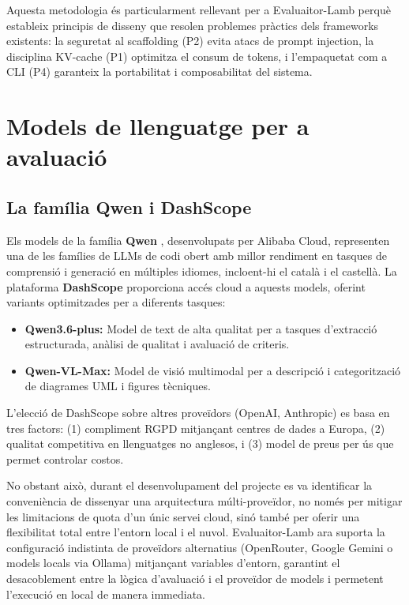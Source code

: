 \documentclass[12pt,a4paper,twoside]{report}
\begin{document}
Aquesta metodologia \'es particularment rellevant per a Evaluaitor-Lamb perqu\`e estableix principis de disseny que resolen problemes pr\`actics dels frameworks existents: la seguretat al scaffolding (P2) evita atacs de prompt injection, la disciplina KV-cache (P1) optimitza el consum de tokens, i l'empaquetat com a CLI (P4) garanteix la portabilitat i composabilitat del sistema.

\section{Models de llenguatge per a avaluaci\'o}
\label{sec:models-ll}

\subsection{La fam\'ilia Qwen i DashScope}
\label{subsec:qwen}

Els models de la fam\'ilia \textbf{Qwen} \cite{qwen2024}, desenvolupats per Alibaba Cloud, representen una de les fam\'ilies de LLMs de codi obert amb millor rendiment en tasques de comprensi\'o i generaci\'o en m\'ultiples idiomes, incloent-hi el catal\`a i el castell\`a. La plataforma \textbf{DashScope} proporciona acc\'es cloud a aquests models, oferint variants optimitzades per a diferents tasques:

\begin{itemize}
    \item \textbf{Qwen3.6-plus:} Model de text de alta qualitat per a tasques d'extracci\'o estructurada, an\`alisi de qualitat i avaluaci\'o de criteris.
    \item \textbf{Qwen-VL-Max:} Model de visi\'o multimodal per a descripci\'o i categoritzaci\'o de diagrames UML i figures t\`ecniques.
\end{itemize}

L'elecci\'o de DashScope sobre altres prove\"idors (OpenAI, Anthropic) es basa en tres factors: (1) compliment RGPD mitjan\c{c}ant centres de dades a Europa, (2) qualitat competitiva en llenguatges no anglesos, i (3) model de preus per \'us que permet controlar costos.

No obstant aix\`o, durant el desenvolupament del projecte es va identificar la conveni\`encia de dissenyar una arquitectura m\'ulti-prove\"idor, no nom\'es per mitigar les limitacions de quota d'un \'unic servei cloud, sin\'o tamb\'e per oferir una flexibilitat total entre l'entorn local i el nuvol. Evaluaitor-Lamb ara suporta la configuraci\'o indistinta de prove\"idors alternatius (OpenRouter, Google Gemini o models locals via Ollama) mitjan\c{c}ant variables d'entorn, garantint el desacoblement entre la l\`ogica d'avaluaci\'o i el prove\"idor de models i permetent l'execuci\'o en local de manera immediata.
\end{document}

